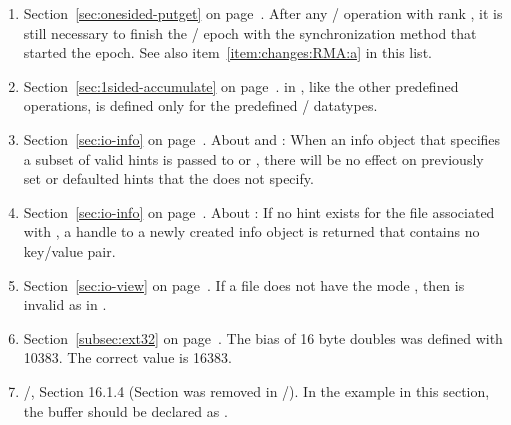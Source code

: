\begin{enumerate}
\item\label{item:changes:RMA:b}
Section~\ref{sec:onesided-putget} on page~\pageref{sec:onesided-putget}.
\newline
After any \RMA/ operation with rank , it is still necessary to
finish the \RMA/ epoch with the synchronization method that started the epoch. 
See also item~\ref{item:changes:RMA:a} in this list. 

\item
Section~\ref{sec:1sided-accumulate} on page~\pageref{sec:1sided-accumulate}.
\newline
{}
in , 
like the other predefined operations, 
is defined only for the predefined \MPI/ datatypes.

\item
Section~\ref{sec:io-info} on page~\pageref{sec:io-info}.
\newline
About  and :
When an info object that specifies a subset of valid hints is passed to
 or , 
there will be no effect on
previously set or defaulted hints that the  does not specify. 

\item
Section~\ref{sec:io-info} on page~\pageref{sec:io-info}.
\newline
About :
If no hint exists 
for the file associated with , 
a handle to a newly created info object is returned that
contains no key/value pair. 

\item
Section~\ref{sec:io-view} on page~\pageref{sec:io-view}.
\newline
If a file does not have the mode ,
then  is invalid as  in 
.  

\item
Section~\ref{subsec:ext32} on page~\pageref{subsec:ext32}.
\newline
The bias of 16 byte doubles was defined with 10383. The correct value is 16383. 

\item
\MPIIIDOTII/, Section 16.1.4 (Section was removed in \MPIIIIDOTO/).
\newline
In the example in this section,
the buffer should be declared as . 


\end{enumerate}

